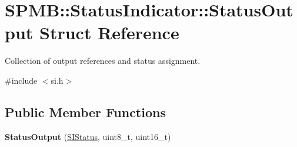 \hypertarget{structSPMB_1_1StatusIndicator_1_1StatusOutput}{}\section{S\+P\+MB\+:\+:Status\+Indicator\+:\+:Status\+Output Struct Reference}
\label{structSPMB_1_1StatusIndicator_1_1StatusOutput}


Collection of output references and status assignment.  




{\ttfamily \#include $<$si.\+h$>$}

\subsection*{Public Member Functions}
\begin{DoxyCompactItemize}
\item 
{\bfseries Status\+Output} (\hyperlink{classSPMB_1_1StatusIndicator_a6d5ae5d45a9147ec76bd72da143fb4de}{S\+I\+Status}, uint8\+\_\+t, uint16\+\_\+t)\hypertarget{structSPMB_1_1StatusIndicator_1_1StatusOutput_a00caa32d7e2c327e97bf79d795bb6bcb}{}\label{structSPMB_1_1StatusIndicator_1_1StatusOutput_a00caa32d7e2c327e97bf79d795bb6bcb}

\end{DoxyCompactItemize}
